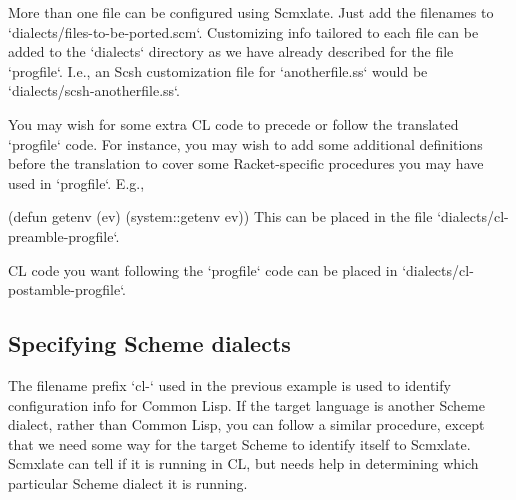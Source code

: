 More than one file can be configured using
Scmxlate.  Just add the filenames to
`dialects/files-to-be-ported.scm`.  Customizing info
tailored to each file can be added to the `dialects`
directory as we have already described for the
file `progfile`.  I.e., an Scsh customization file
for `anotherfile.ss` would be
`dialects/scsh-anotherfile.ss`.

\iffalse
This kind of definition replacement is particularly
useful when the target language is Common Lisp.
For instance, let’s say `progfile` contains
the definition

\begintts
(define lassoc
  (lambda (k al equ?)
    (let loop ((al al))
      (if (null? al) #f
          (let ((c (car al)))
            (if (equ? (car c) k) c
                (loop (cdr al))))))))
\endtt

Scmxlate will provide a complicated if working
Common Lisp translation of the above code, but it
will not be as simple as

\begintts
(defun lassoc (k al equ?)
  (assoc k al :test equ?))
\endtt

You can put this latter definition in
`dialects/cl-progfile` — where the symbol \q{cl}
stands for Common Lisp — and it will be used in
preference to the default translation.
\fi

You may wish for some extra CL code to precede or
follow the translated `progfile` code.  For instance,
you may wish to add some additional definitions before
the translation to cover some Racket-specific
procedures you may have used in `progfile`.  E.g.,

\begintts
(defun getenv (ev)
  (system::getenv ev))
\endtt
This can be placed in the file
`dialects/cl-preamble-progfile`.

CL code you want following the `progfile` code can be
placed in `dialects/cl-postamble-progfile`.

\subsection{Specifying Scheme dialects}

The filename prefix `cl-` used in the previous
example is used to identify configuration info
for Common Lisp.  If the target language is another
Scheme dialect, rather than Common Lisp, you can follow
a similar procedure, except that we need some way for
the target Scheme to identify itself to Scmxlate.
Scmxlate can tell if it is running in CL, but
needs help in determining which particular Scheme
dialect it is running.

